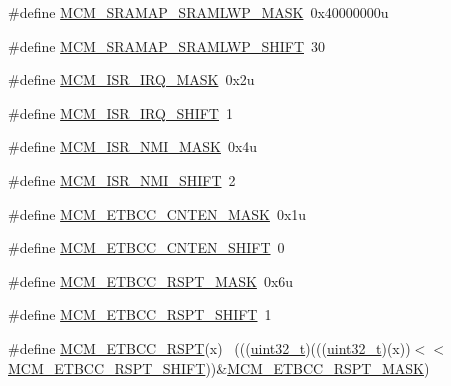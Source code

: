 \begin{DoxyCompactItemize}
\item 
\#define \hyperlink{group___m_c_m___register___masks_ga0beeb7cc649b24a1dd695dac44cd9c96}{M\+C\+M\+\_\+\+S\+R\+A\+M\+A\+P\+\_\+\+S\+R\+A\+M\+L\+W\+P\+\_\+\+M\+A\+SK}~0x40000000u
\item 
\#define \hyperlink{group___m_c_m___register___masks_gaf520c22b65ed17ceb0d1d2b157be3a17}{M\+C\+M\+\_\+\+S\+R\+A\+M\+A\+P\+\_\+\+S\+R\+A\+M\+L\+W\+P\+\_\+\+S\+H\+I\+FT}~30
\item 
\#define \hyperlink{group___m_c_m___register___masks_ga506c541ac574b69cfd550f672a629ba3}{M\+C\+M\+\_\+\+I\+S\+R\+\_\+\+I\+R\+Q\+\_\+\+M\+A\+SK}~0x2u
\item 
\#define \hyperlink{group___m_c_m___register___masks_ga666d11d7cfd1210371f4bd3e71511bd6}{M\+C\+M\+\_\+\+I\+S\+R\+\_\+\+I\+R\+Q\+\_\+\+S\+H\+I\+FT}~1
\item 
\#define \hyperlink{group___m_c_m___register___masks_ga1c841c383ca635d9795909e1210c95e5}{M\+C\+M\+\_\+\+I\+S\+R\+\_\+\+N\+M\+I\+\_\+\+M\+A\+SK}~0x4u
\item 
\#define \hyperlink{group___m_c_m___register___masks_gac9755daab7e754704e66c87f34ce55a4}{M\+C\+M\+\_\+\+I\+S\+R\+\_\+\+N\+M\+I\+\_\+\+S\+H\+I\+FT}~2
\item 
\#define \hyperlink{group___m_c_m___register___masks_gaaffa6b23f821bd7647db6b0abcaf504a}{M\+C\+M\+\_\+\+E\+T\+B\+C\+C\+\_\+\+C\+N\+T\+E\+N\+\_\+\+M\+A\+SK}~0x1u
\item 
\#define \hyperlink{group___m_c_m___register___masks_ga8262666b7fec7b20ea3e871bdb325dc1}{M\+C\+M\+\_\+\+E\+T\+B\+C\+C\+\_\+\+C\+N\+T\+E\+N\+\_\+\+S\+H\+I\+FT}~0
\item 
\#define \hyperlink{group___m_c_m___register___masks_ga155cfa2bfc46e64c665a8aeed061da6f}{M\+C\+M\+\_\+\+E\+T\+B\+C\+C\+\_\+\+R\+S\+P\+T\+\_\+\+M\+A\+SK}~0x6u
\item 
\#define \hyperlink{group___m_c_m___register___masks_ga7e85c0a405fa8e736ea6b11e2a2ce2cf}{M\+C\+M\+\_\+\+E\+T\+B\+C\+C\+\_\+\+R\+S\+P\+T\+\_\+\+S\+H\+I\+FT}~1
\item 
\#define \hyperlink{group___m_c_m___register___masks_ga662ac6f34a5c06e2209edeb7f4ec3fd3}{M\+C\+M\+\_\+\+E\+T\+B\+C\+C\+\_\+\+R\+S\+PT}(x)                                            ~(((\hyperlink{_p_e___types_8h_a33594304e786b158f3fb30289278f5af}{uint32\+\_\+t})(((\hyperlink{_p_e___types_8h_a33594304e786b158f3fb30289278f5af}{uint32\+\_\+t})(x))$<$$<$\hyperlink{group___m_c_m___register___masks_ga7e85c0a405fa8e736ea6b11e2a2ce2cf}{M\+C\+M\+\_\+\+E\+T\+B\+C\+C\+\_\+\+R\+S\+P\+T\+\_\+\+S\+H\+I\+FT}))\&\hyperlink{group___m_c_m___register___masks_ga155cfa2bfc46e64c665a8aeed061da6f}{M\+C\+M\+\_\+\+E\+T\+B\+C\+C\+\_\+\+R\+S\+P\+T\+\_\+\+M\+A\+SK})
$$
\end{DoxyCompactItemize}
